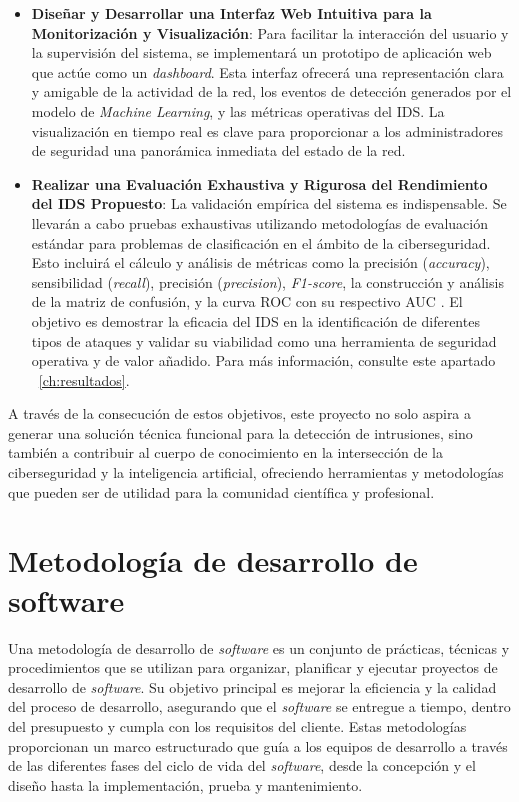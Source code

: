 \begin{itemize}
    \item\textbf{Diseñar y Desarrollar una Interfaz Web Intuitiva para la Monitorización y Visualización}: Para facilitar la interacción del usuario y la supervisión del sistema, se implementará un prototipo de aplicación web que actúe como un \textit{dashboard}. Esta interfaz ofrecerá una representación clara y amigable de la actividad de la red, los eventos de detección generados por el modelo de \textit{Machine Learning}, y las métricas operativas del IDS. La visualización en tiempo real es clave para proporcionar a los administradores de seguridad una panorámica inmediata del estado de la red.
    
    \item\textbf{Realizar una Evaluación Exhaustiva y Rigurosa del Rendimiento del IDS Propuesto}: La validación empírica del sistema es indispensable. Se llevarán a cabo pruebas exhaustivas utilizando metodologías de evaluación estándar para problemas de clasificación en el ámbito de la ciberseguridad. Esto incluirá el cálculo y análisis de métricas como la precisión (\textit{accuracy}), sensibilidad (\textit{recall}), precisión (\textit{precision}), \textit{F1-score}, la construcción y análisis de la matriz de confusión, y la curva ROC con su respectivo AUC \cite{PolaniaArias2021EvaluacionMLIDS}. El objetivo es demostrar la eficacia del IDS en la identificación de diferentes tipos de ataques y validar su viabilidad como una herramienta de seguridad operativa y de valor añadido. Para más información, consulte este apartado ~\ref{ch:resultados}.
 
\end{itemize}

A través de la consecución de estos objetivos, este proyecto no solo aspira a generar una solución técnica funcional para la detección de intrusiones, sino también a contribuir al cuerpo de conocimiento en la intersección de la ciberseguridad y la inteligencia artificial, ofreciendo herramientas y metodologías que pueden ser de utilidad para la comunidad científica y profesional.

\section{Metodología de desarrollo de software}
Una metodología de desarrollo de \textit{software} es un conjunto de prácticas,
técnicas y procedimientos que se utilizan para organizar, planificar y ejecutar proyectos de desarrollo de \textit{software}. Su objetivo principal es mejorar la eficiencia y la calidad del proceso de desarrollo, asegurando que el \textit{software} se entregue a tiempo, dentro del presupuesto y cumpla con los requisitos del cliente. Estas metodologías proporcionan un marco estructurado que guía a los equipos de desarrollo a través de las diferentes fases del ciclo de vida del \textit{software}, desde la concepción y el diseño hasta la implementación, prueba y mantenimiento.


